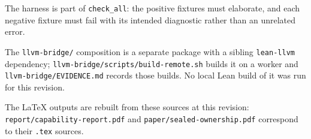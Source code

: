 \documentclass[10pt,a4paper]{article}
\newcommand{\file}[1]{\texttt{\small #1}}
\begin{document}
The harness is part of \texttt{check\_all}: the positive fixtures must elaborate,
and each negative fixture must fail with its intended diagnostic rather than an
unrelated error.

The \file{llvm-bridge/} composition is a separate package with a sibling
\file{lean-llvm} dependency; \file{llvm-bridge/scripts/build-remote.sh} builds it
on a worker and \file{llvm-bridge/EVIDENCE.md} records those builds. No local
Lean build of it was run for this revision.

The LaTeX outputs are rebuilt from these sources at this revision:
\file{report/capability-report.pdf} and \file{paper/sealed-ownership.pdf}
correspond to their \file{.tex} sources.
\end{document}
